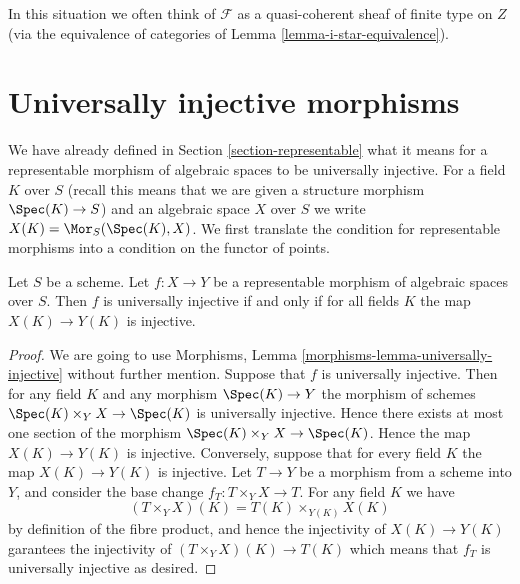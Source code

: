 \noindent
In this situation we often think of $\mathcal{F}$ as a quasi-coherent
sheaf of finite type on $Z$ (via the equivalence of categories of
Lemma \ref{lemma-i-star-equivalence}).









\section{Universally injective morphisms}
\label{section-universally-injective}

\noindent
We have already defined in Section \ref{section-representable}
what it means for a representable morphism of algebraic spaces
to be universally injective. For a field $K$ over $S$ (recall this means that
we are given a structure morphism $\Spec(K) \to S$) and an
algebraic space $X$ over $S$ we write
$X(K) = \Mor_S(\Spec(K), X)$. We first translate the
condition for representable morphisms into a condition on the functor
of points.

\begin{lemma}
\label{lemma-universally-injective-representable}
Let $S$ be a scheme. Let $f : X \to Y$ be a representable
morphism of algebraic spaces over $S$. Then
$f$ is universally injective if and only if for all fields $K$ the
map $X(K) \to Y(K)$ is injective.
\end{lemma}

\begin{proof}
We are going to use
Morphisms, Lemma \ref{morphisms-lemma-universally-injective}
without further mention.
Suppose that $f$ is universally injective. Then for any field $K$ and any
morphism $\Spec(K) \to Y$ the morphism of schemes
$\Spec(K) \times_Y X \to \Spec(K)$ is universally injective.
Hence there exists at most one section of the morphism
$\Spec(K) \times_Y X \to \Spec(K)$. Hence the map
$X(K) \to Y(K)$ is injective. Conversely, suppose that for every field $K$
the map $X(K) \to Y(K)$ is injective. Let $T \to Y$ be a morphism from a
scheme into $Y$, and consider the base change $f_T : T \times_Y X \to T$.
For any field $K$ we have
$$
(T \times_Y X)(K) = T(K) \times_{Y(K)} X(K)
$$
by definition of the fibre product, and hence the injectivity of
$X(K) \to Y(K)$ garantees the injectivity of
$(T \times_Y X)(K) \to T(K)$ which means that $f_T$ is universally injective
as desired.
\end{proof}

